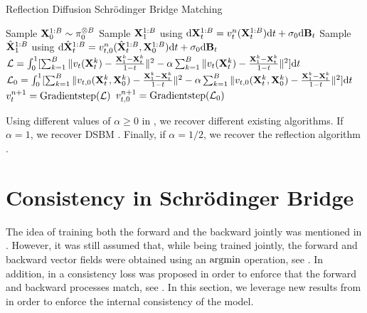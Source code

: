 \documentclass{article}
\begin{document}
\begin{algorithm}[H]
\caption{Reflection Diffusion Schr\"odinger Bridge Matching}
\label{alg:reflection_projection_extended}
\begin{algorithmic}[1]
\STATE Sample $\mathbf{X}_0^{1:B} \sim \pi_0^{\otimes B}$ 
\STATE Sample $\mathbf{X}_1^{1:B}$ using $\mathrm{d} \mathbf{X}_t^{1:B} = v_t^n(\mathbf{X}_t^{1:B}) \mathrm{d} t + \sigma_0 \mathrm{d} \mathbf{B}_t $
\STATE Sample $\hat{\mathbf{X}}_1^{1:B}$ using $\mathrm{d} \hat{\mathbf{X}}_t^{1:B} = v_{t,0}^n(\hat{\mathbf{X}}_t^{1:B}, \mathbf{X}_0^{1:B}) \mathrm{d} t + \sigma_0 \mathrm{d} \mathbf{B}_t $
\STATE $\mathcal{L} = \int_0^1 [\sum_{k=1}^{B} \| v_t(\mathbf{X}_t^k) - \tfrac{\mathbf{X}_1^k - \mathbf{X}_t^k}{1-t} \|^2 - \alpha\sum_{k=1}^B \| v_t(\mathbf{X}_t^k) - \tfrac{\mathbf{X}_1^k - \mathbf{X}_t^k}{1-t} \|^2] \mathrm{d} t $
\STATE $\mathcal{L}_0 = \int_0^1 [\sum_{k=1}^{B} \| v_{t,0}(\mathbf{X}_t^k, \mathbf{X}_0^k) - \tfrac{\mathbf{X}_1^k - \mathbf{X}_t^k}{1-t} \|^2 - \alpha \sum_{k=1}^B \| v_{t,0}(\mathbf{X}_t^k, \mathbf{X}_0^k) - \tfrac{\mathbf{X}_1^k - \mathbf{X}_t^k}{1-t} \|^2] \mathrm{d} t $
\STATE $v^{n+1}_t = \mathrm{Gradient step}(\mathcal{L})$
\STATE $v^{n+1}_{t,0} = \mathrm{Gradient step}(\mathcal{L}_0)$
\ENDWHILE
\ENDFOR
{}
\end{algorithmic}
\end{algorithm}

Using different values of $\alpha \geq 0$ in , we recover different existing algorithms.  If $\alpha =1$, we recover DSBM \cite{shi2023DSBM}. Finally, if $\alpha = 1/2$, we recover the reflection algorithm .

\section{Consistency in Schr\"odinger Bridge}
\label{sec:consistency_schrodinger_bridge}

The idea of training both the forward and the backward jointly was mentioned in \cite[Section G]{shi2023DSBM}. However, it was still assumed that, while being trained jointly, the forward and backward vector fields were obtained using an $\mathrm{argmin}$ operation, see \cite[Equation (43), (44)]{shi2023DSBM}. In addition, in \cite[Section G]{shi2023DSBM} a consistency loss was proposed in order to enforce that the forward and backward processes match, see \cite[Equation (49)]{shi2023DSBM}. In this section, we leverage new results from \cite{daras2024consistent,debortoli2024target} in order to enforce the internal consistency of the model. 
\end{document}
